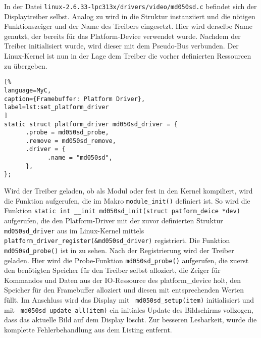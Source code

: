 In der Datei \lstinline|linux-2.6.33-lpc313x/drivers/video/md050sd.c| befindet sich der Displaytreiber selbst. Analog zu  wird in  die Struktur instanziiert und die nötigen Funktionszeiger und der Name des Treibers eingesetzt. Hier wird derselbe Name genutzt, der bereits für das Platform-Device verwendet wurde. Nachdem der Treiber initialisiert wurde, wird dieser mit dem Pseudo-Bus verbunden. Der Linux-Kernel ist nun in der Lage dem Treiber die vorher definierten Ressourcen zu übergeben.

\begin{lstlisting}[%
language=MyC,
caption={Framebuffer: Platform Driver},
label=lst:set_platform_driver
]
static struct platform_driver md050sd_driver = {
      .probe = md050sd_probe,
      .remove = md050sd_remove,
      .driver = {
            .name = "md050sd",
      },
};
\end{lstlisting}

Wird der Treiber geladen, ob als Modul oder fest in den Kernel kompiliert, wird die Funktion aufgerufen, die im Makro \lstinline|module_init()| definiert ist. So wird die Funktion \lstinline|static int __init md050sd_init(struct patform_deice *dev)| aufgerufen, die den Platform-Driver mit der zuvor definierten Struktur \lstinline|md050sd_driver| aus  im Linux-Kernel mittels 
\lstinline|platform_driver_register(&md050sd_driver)|   registriert. Die Funktion \lstinline|md050sd_probe()| ist in  zu sehen. 
Nach der Registrierung wird der Treiber geladen. Hier wird die Probe-Funktion \lstinline|md050sd_probe()| aufgerufen, die zuerst den benötigten Speicher für den Treiber selbst alloziert, die Zeiger für Kommandos und Daten aus der IO-Ressource des platform\_device holt, den Speicher für den Framebuffer alloziert und diesen mit entsprechenden Werten füllt. Im Anschluss wird das Display mit \lstinline| md050sd_setup(item)| initialisiert und mit \lstinline| md050sd_update_all(item)| ein initiales Update des Bildschirms vollzogen, dass das aktuelle Bild auf dem Display löscht. Zur besseren Lesbarkeit, wurde die komplette Fehlerbehandlung aus dem Listing entfernt. 


